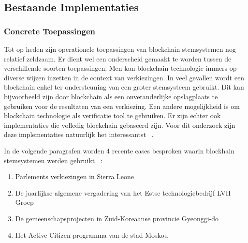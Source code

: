	\subsection{Bestaande Implementaties}
			\subsubsection{Concrete Toepassingen}
			Tot op heden zijn operationele toepassingen van blockchain stemsystemen nog relatief zeldzaam.  Er dient wel  een onderscheid gemaakt te worden tussen de verschillende soorten toepassingen. Men kan  blockchain technologie immers op diverse wijzen inzetten in de context van verkiezingen. In veel gevallen wordt een blockchain enkel ter ondersteuning van een groter stemsysteem gebruikt. Dit kan bijvoorbeeld zijn door blockchain als  een onveranderlijke opslagplaats te gebruiken voor de resultaten van een verkiezing. Een andere mogelijkheid is om blockchain technologie als verificatie tool te gebruiken. Er zijn echter ook implementaties die volledig blockchain gebaseerd zijn. Voor dit onderzoek zijn deze implementaties natuurlijk het interessantst ~\autocite{Kshetri2018}.
			
			In de volgende paragrafen worden 4 recente cases besproken waarin blockhain stemsystemen werden gebruikt ~\autocite{Kshetri2018}:
			\begin{enumerate}
				\item Parlements verkiezingen in Sierra Leone
				\item De jaarlijkse algemene vergadering van het Estse technologiebedrijf LVH Groep
				\item De gemeenschapsprojecten in Zuid-Koreaanse provincie Gyeonggi-do
				\item Het Active Citizen-programma van de stad Moskou
			\end{enumerate}
				
